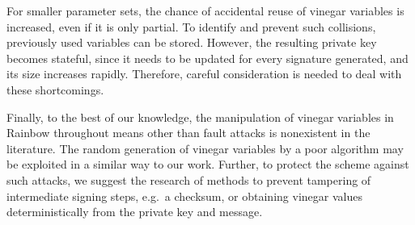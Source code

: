 \documentclass[english]{ufsc-thesis-rn46-2019/ufsc-thesis-rn46-2019}
\theoremstyle{definition}
\begin{document}
For smaller parameter sets, the chance of accidental reuse of vinegar variables
is increased, even if it is only partial. To identify and prevent such
collisions, previously used variables can be stored. However, the resulting
private key becomes stateful, since it needs to be updated for every signature
generated, and its size increases rapidly. Therefore, careful consideration is
needed to deal with these shortcomings.

Finally, to the best of our knowledge, the manipulation of vinegar variables in
Rainbow throughout means other than fault attacks is nonexistent in the
literature. The random generation of vinegar variables by a poor algorithm may
be exploited in a similar way to our work. Further, to protect the scheme
against such attacks, we suggest the research of methods to prevent tampering
of intermediate signing steps, e.g.\ a checksum, or obtaining vinegar values
deterministically from the private key and message.

\postextual%

\end{document}
